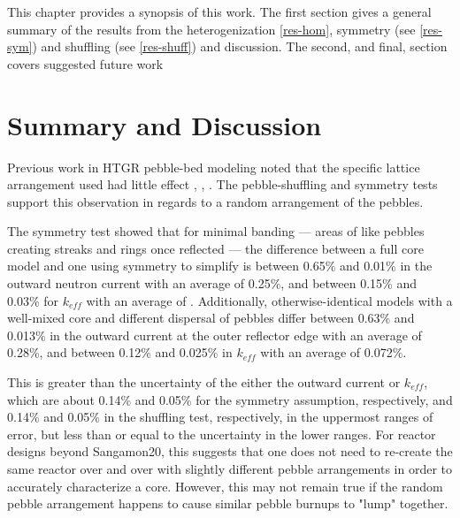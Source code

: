 This chapter provides a synopsis of this work.  The first section gives a general summary of the results from the heterogenization \autoref{res-hom}, symmetry (see \autoref{res-sym}) and shuffling (see \autoref{res-shuff}) and discussion.  The second, and final, section covers suggested future work

\section{Summary and Discussion}

Previous work in HTGR pebble-bed modeling noted that the specific lattice arrangement used had little effect \cite{turkmen_effect_2012}, \cite{karriem_mcnp_2001}, \cite{brown_stochastic_2005}.  The pebble-shuffling and symmetry tests support this observation in regards to a  random arrangement of the pebbles.

The symmetry test showed that for minimal banding --- areas of like pebbles creating streaks and rings once reflected --- the difference between a full core model and one using symmetry to simplify is between 0.65\% and 0.01\% in the outward neutron current with an average of 0.25\%, and between 0.15\% and 0.03\% for $k_{eff}$ with an average of .  Additionally, otherwise-identical models with a well-mixed core and different dispersal of pebbles differ between 0.63\% and 0.013\% in the outward current at the outer reflector edge with an average of 0.28\%, and between 0.12\% and 0.025\% in $k_{eff}$ with an average of 0.072\%.  

This is greater than the uncertainty of the either the outward current or $k_{eff}$, which are about 0.14\% and 0.05\% for the symmetry assumption, respectively, and 0.14\% and 0.05\% in the shuffling test, respectively, in the uppermost ranges of error, but less than or equal to the uncertainty in the lower ranges. For reactor designs beyond Sangamon20, this suggests that one does not need to re-create the same reactor over and over with slightly different pebble arrangements in order to accurately characterize a core.  However, this may not remain true if the random pebble arrangement happens to cause similar pebble burnups to "lump" together.

